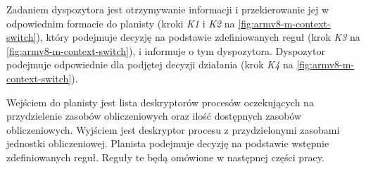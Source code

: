 \documentclass[../../main]{subfiles}
\begin{document}
Zadaniem dyspozytora jest otrzymywanie informacji i przekierowanie jej w odpowiednim formacie do planisty (kroki \textit{K1} i \textit{K2} na \cref{fig:armv8-m-context-switch}), który podejmuje decyzję na podstawie zdefiniowanych reguł (krok \textit{K3} na \cref{fig:armv8-m-context-switch}), i informuje o tym dyspozytora. Dyspozytor podejmuje odpowiednie dla podjętej decyzji działania (krok \textit{K4} na \cref{fig:armv8-m-context-switch}).

Wejściem do planisty jest lista deskryptorów procesów oczekujących na przydzielenie zasobów obliczeniowych oraz ilość dostępnych zasobów obliczeniowych. Wyjściem jest deskryptor procesu z przydzielonymi zasobami jednostki obliczeniowej. Planista podejmuje decyzję na podstawie wstępnie zdefiniowanych reguł. Reguły te będą omówione w następnej części pracy.
\end{document}

